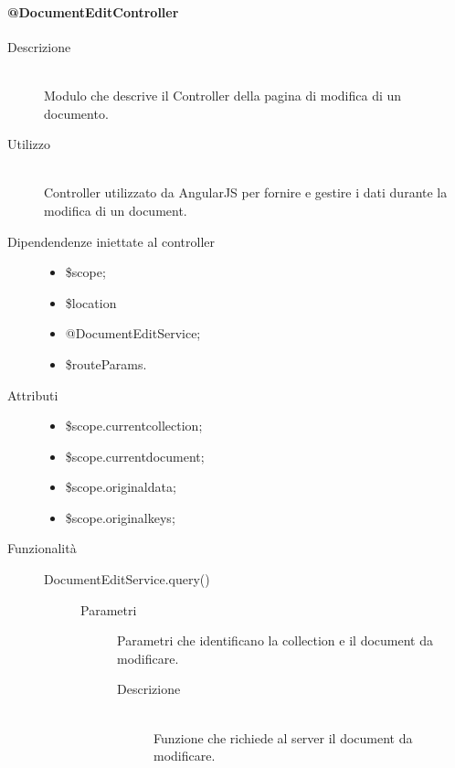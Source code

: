 \paragraph{@DocumentEditController}
\begin{description}
 \item[Descrizione] \hfill \\
 Modulo che descrive il Controller della pagina di modifica di un documento.
 
 \item[Utilizzo] \hfill \\
 Controller utilizzato da AngularJS per fornire e gestire i dati durante la modifica di un document.
 
 \item[Dipendendenze iniettate al controller] \hfill
 \begin{itemize}
  \item \$scope;
  \item \$location
  \item @DocumentEditService;
  \item \$routeParams.
  
 \end{itemize}
 
 \item[Attributi] \hfill
 \begin{itemize}
 \item  \$scope.current\textunderscore collection;
    \item  \$scope.current\textunderscore document;
    \item  \$scope.original\textunderscore data;
    \item  \$scope.original\textunderscore keys;
 \end{itemize}
 
 \item[Funzionalità] \hfill
 \begin{description}
  \item[DocumentEditService.query()] \hfill
   \begin{description}
  	\item[Parametri]
  		\begin{mldescription}
       
        Parametri che identificano la collection e il document da modificare.
  		\end{mldescription}
  	\begin{description}
  	\item[Descrizione] \hfill \\
	Funzione che richiede al server il document da modificare.
	\end{description}
  \end{description}
 

\end{description}
\end{description}
